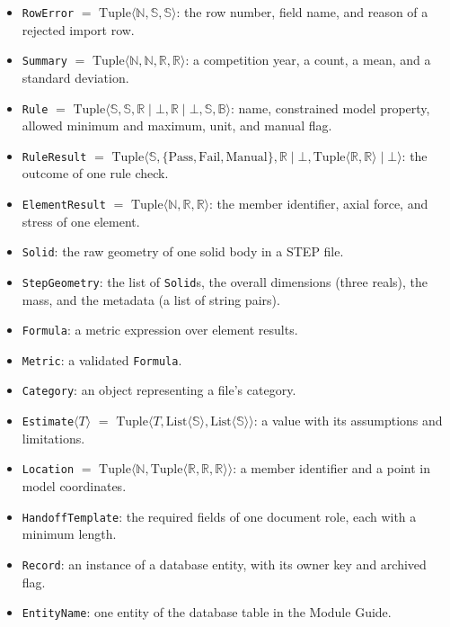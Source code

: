 \documentclass[12pt, titlepage]{article}
\begin{document}
\begin{itemize}
  \item \texttt{RowError} $=$ $\text{Tuple}\langle \mathbb{N}, \mathbb{S}, \mathbb{S} \rangle$: the row number, field name, and reason of a rejected import row.
  \item \texttt{Summary} $=$ $\text{Tuple}\langle \mathbb{N}, \mathbb{N}, \mathbb{R}, \mathbb{R} \rangle$: a competition year, a count, a mean, and a standard deviation.
  \item \texttt{Rule} $=$ $\text{Tuple}\langle \mathbb{S}, \mathbb{S}, \mathbb{R} \mid \bot, \mathbb{R} \mid \bot, \mathbb{S}, \mathbb{B} \rangle$: name, constrained model property, allowed minimum and maximum, unit, and manual flag.
  \item \texttt{RuleResult} $=$ $\text{Tuple}\langle \mathbb{S}, \{\text{Pass}, \text{Fail}, \text{Manual}\}, \mathbb{R} \mid \bot, \text{Tuple}\langle \mathbb{R}, \mathbb{R} \rangle \mid \bot \rangle$: the outcome of one rule check.
  \item \texttt{ElementResult} $=$ $\text{Tuple}\langle \mathbb{N}, \mathbb{R}, \mathbb{R} \rangle$: the member identifier, axial force, and stress of one element.
  \item \texttt{Solid}: the raw geometry of one solid body in a STEP file.
  \item \texttt{StepGeometry}: the list of \texttt{Solid}s, the overall dimensions (three reals), the mass, and the metadata (a list of string pairs).
  \item \texttt{Formula}: a metric expression over element results. 
  \item \texttt{Metric}: a validated \texttt{Formula}.
  \item \texttt{Category}: an object representing a file's category.
  \item \texttt{Estimate}$\langle T \rangle$ $=$ $\text{Tuple}\langle T, \text{List}\langle \mathbb{S} \rangle, \text{List}\langle \mathbb{S} \rangle \rangle$: a value with its assumptions and limitations.
  \item \texttt{Location} $=$ $\text{Tuple}\langle \mathbb{N}, \text{Tuple}\langle \mathbb{R}, \mathbb{R}, \mathbb{R} \rangle \rangle$: a member identifier and a point in model coordinates.
  \item \texttt{HandoffTemplate}: the required fields of one document role, each with a minimum length.
  \item \texttt{Record}: an instance of a database entity, with its owner key and archived flag.
  \item \texttt{EntityName}: one entity of the database table in the Module Guide.

\end{itemize}
\end{document}
